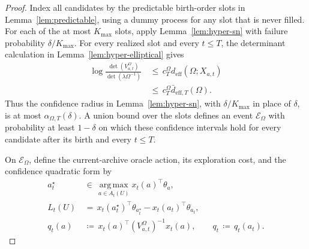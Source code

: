 \documentclass{article} %
\begin{document}
\begin{proof}
Index all candidates by the predictable birth-order slots in
Lemma~\ref{lem:predictable}, using a dummy process for any slot that is never
filled. For each of the at most \(K_{\max}\) slots, apply
Lemma~\ref{lem:hyper-sn} with failure probability
\(\delta/K_{\max}\). For every realized slot and every \(t\le T\), the
determinant calculation in Lemma~\ref{lem:hyper-elliptical} gives
\begin{equation}
\label{eq:hyper-deff-proof-det-cap}
\begin{aligned}
\log
\frac{\det(V_{a,t}^{\Omega})}
{\det(\lambda\Omega^{-1})}
&\,\leq\,
c_T^\Omega d_{\mathrm{eff}}(\Omega;X_{a,t})
\\
&\,\leq\,
c_T^\Omega\bar d_{\mathrm{eff},T}(\Omega).
\end{aligned}
\end{equation}
Thus the confidence radius in Lemma~\ref{lem:hyper-sn}, with
\(\delta/K_{\max}\) in place of \(\delta\), is at most
\(\alpha_{\Omega,T}(\delta)\). A union bound over the slots defines an event
\(\mathcal E_\Omega\) with probability at least \(1-\delta\) on which these
confidence intervals hold for every candidate after its birth and every
\(t\le T\).

On \(\mathcal E_\Omega\), define the current-archive oracle action, its
exploration cost, and the confidence quadratic form by
\begin{align}
a_t^\star
&\,\in\,
\operatorname*{arg\,max}_{a\in A_t(U)}
x_t(a)^\top\theta_a,
\label{eq:hyper-deff-proof-oracle-action}
\\
L_t(U)
&\,=\,
x_t(a_t^\star)^\top\theta_{a_t^\star}
-x_t(a_t)^\top\theta_{a_t},
\label{eq:hyper-deff-proof-L}
\\
q_t(a)
&\,\coloneqq\,
x_t(a)^\top
\left(V_{a,t}^{\Omega}\right)^{-1}
x_t(a),
\qquad
q_t\,\coloneqq\,q_t(a_t).
\label{eq:hyper-deff-proof-qt}
\end{align}


\end{proof}
\end{document}
